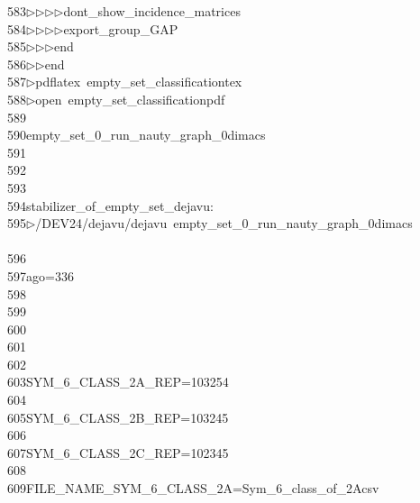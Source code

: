 \begin{tabbing}
583\>$\triangleright$\>$\triangleright$\>$\triangleright$\>$\triangleright$\>dont\_show\_incidence\_matrices\ \\[0pt]
584\>$\triangleright$\>$\triangleright$\>$\triangleright$\>$\triangleright$\>export\_group\_GAP\ \\[0pt]
585\>$\triangleright$\>$\triangleright$\>$\triangleright$\>end\ \\[0pt]
586\>$\triangleright$\>$\triangleright$\>end\\[0pt]
587\>$\triangleright$\>pdflatex\ empty\_set\_classificationtex\\[0pt]
588\>$\triangleright$\>open\ empty\_set\_classificationpdf\\[0pt]
589\>\\[0pt]
590\>empty\_set\_0\_run\_nauty\_graph\_0dimacs\\[0pt]
591\>\\[0pt]
592\>\\[0pt]
593\>\\[0pt]
594\>stabilizer\_of\_empty\_set\_dejavu:\\[0pt]
595\>$\triangleright$\>/DEV24/dejavu/dejavu\ empty\_set\_0\_run\_nauty\_graph\_0dimacs\\[0pt]
\>\\[0pt]
596\>\\[0pt]
597\>ago=336\\[0pt]
598\>\\[0pt]
599\>\\[0pt]
600\>\\[0pt]
601\>\\[0pt]
602\>\\[0pt]
603\>SYM\_6\_CLASS\_2A\_REP=103254\\[0pt]
604\>\\[0pt]
605\>SYM\_6\_CLASS\_2B\_REP=103245\\[0pt]
606\>\\[0pt]
607\>SYM\_6\_CLASS\_2C\_REP=102345\\[0pt]
608\>\\[0pt]
609\>FILE\_NAME\_SYM\_6\_CLASS\_2A=Sym\_6\_class\_of\_2Acsv\\[0pt]

\end{tabbing}
